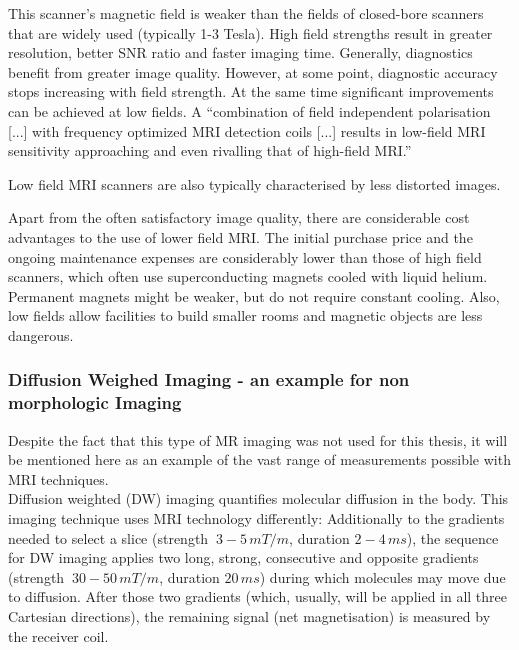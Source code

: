 This scanner's magnetic field is weaker than the fields of closed-bore scanners that are widely used (typically 1-3 Tesla).
High field strengths result in greater resolution, better SNR ratio and faster imaging time.
Generally, diagnostics benefit from greater image quality.
However, at some point, diagnostic accuracy stops increasing with field strength.
At the same time significant improvements can be achieved at low fields.
A ``combination of field independent polarisation [...] with frequency optimized MRI detection coils [...] results in low-field MRI sensitivity approaching and even rivalling that of high-field MRI.'' \cite{Coffey2013}

Low field MRI scanners are also typically characterised by less distorted images. \cite{Fransson2001}

Apart from the often satisfactory image quality, there are considerable cost advantages to the use of lower field MRI.
The initial purchase price and the ongoing maintenance expenses are considerably lower than those of high field scanners, which often use superconducting magnets cooled with liquid helium. \cite{Rutt1996}
Permanent magnets might be weaker, but do not require constant cooling.
Also, low fields allow facilities to build smaller rooms and magnetic objects are less dangerous.


\subsubsection{Diffusion Weighed Imaging - an example for non morphologic Imaging}

Despite the fact that this type of MR imaging was not used for this thesis, it will be mentioned here as an example of the vast range of measurements possible with MRI techniques.\\

Diffusion weighted (DW) imaging quantifies molecular diffusion in the body.
This imaging technique uses MRI technology differently:
Additionally to the gradients needed to select a slice (strength $~3-5\, mT/m$, duration $2-4\, ms$), the sequence for DW imaging applies two long, strong, consecutive and opposite gradients (strength $~30-50\, mT/m$, duration $20\, ms$) during which molecules may move due to diffusion.
After those two gradients (which, usually, will be applied in all three Cartesian directions), the remaining signal (net magnetisation) is measured by the receiver coil.

